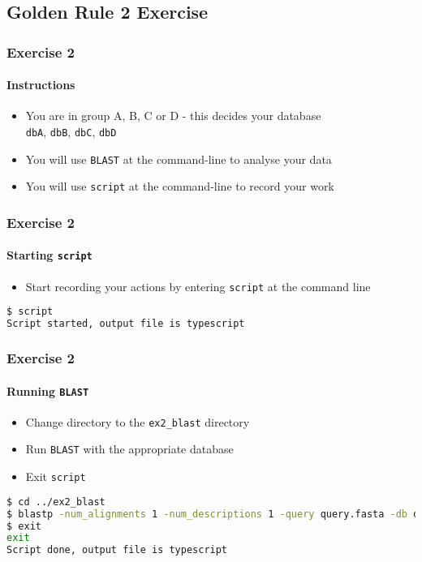 %

\subsection{Golden Rule 2 Exercise}
\begin{frame}
  \frametitle{Exercise 2}
  \framesubtitle{Instructions}    
  \begin{itemize}
    \item You are in group A, B, C or D - this decides your database\\
    \texttt{dbA}, \texttt{dbB}, \texttt{dbC}, \texttt{dbD}
    \item You will use \texttt{BLAST} at the command-line to analyse your data
    \item You will use \texttt{script} at the command-line to record your work
  \end{itemize}
\end{frame}

\begin{frame}[fragile]
  \frametitle{Exercise 2}
  \framesubtitle{Starting \texttt{script}}    
  \begin{itemize}
    \item Start recording your actions by entering \texttt{script} at the command line      
  \end{itemize}
\begin{lstlisting}[language=bash]
$ script
Script started, output file is typescript
\end{lstlisting}    
\end{frame}

\begin{frame}[fragile]
  \frametitle{Exercise 2}
  \framesubtitle{Running \texttt{BLAST}}
  \begin{itemize}
    \item Change directory to the \texttt{ex2\_blast} directory
    \item Run \texttt{BLAST} with the appropriate database
    \item Exit \texttt{script}
  \end{itemize}
\begin{lstlisting}[language=bash]
$ cd ../ex2_blast
$ blastp -num_alignments 1 -num_descriptions 1 -query query.fasta -db dbA
$ exit
exit
Script done, output file is typescript
\end{lstlisting}    
\end{frame}

